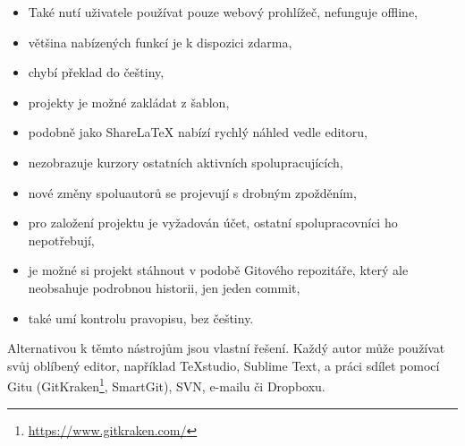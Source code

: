 \begin{itemize}
	\item Také nutí uživatele používat pouze webový prohlížeč, nefunguje offline,
	\item většina nabízených funkcí je k dispozici zdarma,
	\item chybí překlad do češtiny,
	\item projekty je možné zakládat z šablon,
	\item podobně jako ShareLaTeX nabízí rychlý náhled vedle editoru,
	\item nezobrazuje kurzory ostatních aktivních spolupracujících,
	\item nové změny spoluautorů se projevují s drobným zpožděním,
	\item pro založení projektu je vyžadován účet, ostatní spolupracovníci ho nepotřebují,
	\item je možné si projekt stáhnout v podobě Gitového repozitáře, který ale neobsahuje podrobnou historii, jen jeden commit,
	\item také umí kontrolu pravopisu, bez češtiny.
\end{itemize}

Alternativou k těmto nástrojům jsou vlastní řešení. Každý autor může používat svůj oblíbený editor, například TeXstudio, Sublime Text, a práci sdílet pomocí Gitu (GitKraken\footnote{\url{https://www.gitkraken.com/}}, SmartGit), SVN, e-mailu či Dropboxu.
